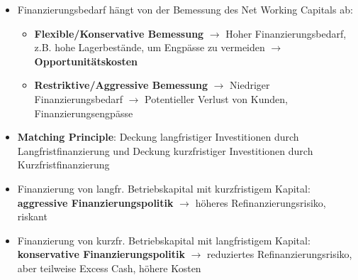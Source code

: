 \begin{itemize}
	\item Finanzierungsbedarf hängt von der Bemessung des Net Working Capitals ab:
	\begin{itemize}
		\item \textbf{Flexible/Konservative Bemessung} $\rightarrow$ Hoher Finanzierungsbedarf, z.B. hohe Lagerbestände, um Engpässe zu vermeiden $\rightarrow$ \textbf{Opportunitätskosten}
		\item \textbf{Restriktive/Aggressive Bemessung} $\rightarrow$ Niedriger Finanzierungsbedarf $\rightarrow$ Potentieller Verlust von Kunden, Finanzierungsengpässe
	\end{itemize}
	\item \textbf{Matching Principle}: Deckung langfristiger Investitionen durch Langfristfinanzierung und Deckung kurzfristiger Investitionen durch Kurzfristfinanzierung
	\item Finanzierung von langfr. Betriebskapital mit kurzfristigem Kapital: \textbf{aggressive Finanzierungspolitik} $\rightarrow$ höheres Refinanzierungsrisiko, riskant
	\item Finanzierung von kurzfr. Betriebskapital mit langfristigem Kapital: \textbf{konservative Finanzierungspolitik} $\rightarrow$ reduziertes
	Refinanzierungsrisiko, aber teilweise Excess Cash, höhere Kosten
\end{itemize}
\pagebreak
